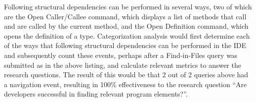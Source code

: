 Following structural dependencies can be performed in several ways, two of which are the Open Caller/Callee command, which displays a list of methods that call and are called by the current method, and the Open Definition command, which opens the definition of a type. Categorization analysis would first determine each of the ways that following structural dependencies can be performed in the IDE and subsequently count these events, perhaps after a
Find-in-Files query was submitted as in the above listing, and calculate relevant metrics to answer the research questions. The result of this would be that 2 out of 2 queries above had a navigation event, resulting in 100\% effectiveness to the research question ``Are developers successful in finding relevant program elements?''.


